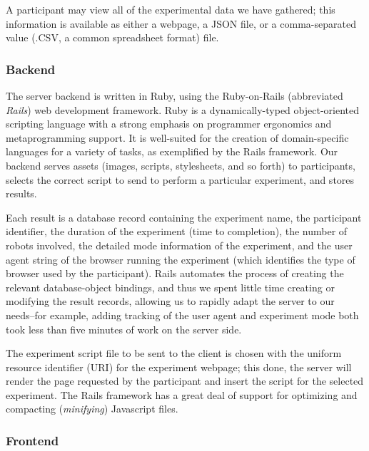 A participant may view all of the experimental data we have gathered; this information is available as either a webpage, a JSON file, or a comma-separated value (.CSV, a common spreadsheet format) file.

\subsubsection{Backend}

The server backend is written in Ruby, using the Ruby-on-Rails (abbreviated \emph{Rails}) web development framework. Ruby is a dynamically-typed object-oriented scripting language with a strong emphasis on programmer ergonomics and metaprogramming support. It is well-suited for the creation of domain-specific languages for a variety of tasks, as exemplified by the Rails framework. Our backend serves assets (images, scripts, stylesheets, and so forth) to participants, selects the correct script to send to perform a particular experiment, and stores results.

Each result is a database record containing the experiment name, the participant identifier, the duration of the experiment (time to completion), the number of robots involved, the detailed mode information of the experiment, and the user agent string of the browser running the experiment (which identifies the type of browser used by the participant). Rails automates the process of creating the relevant database-object bindings, and thus we spent little time creating or modifying the result records, allowing us to rapidly adapt the server to our needs--for example, adding tracking of the user agent and experiment mode both took less than five minutes of work on the server side.

The experiment script file to be sent to the client is chosen with the uniform resource identifier (URI) for the experiment webpage; this done, the server will render the page requested by the participant and insert the script for the selected experiment. The Rails framework has a great deal of support for optimizing and compacting (\emph{minifying}) Javascript files.

\subsubsection{Frontend}

